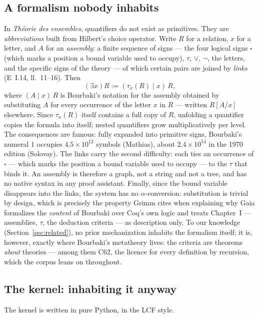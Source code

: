 \documentclass[11pt]{article}
\theoremstyle{remark}\newtheorem{example}{Example}
\begin{document}
\subsection{A formalism nobody inhabits}
\label{sec:tau}
In \emph{Th\'eorie des ensembles}, quantifiers do not exist as primitives. They are
\emph{abbreviations} built from Hilbert's choice operator. Write $R$ for a relation,
$x$ for a letter, and $A$ for an \emph{assembly}: a finite sequence of signs --- the
four logical signs $\square$ (which marks a position a bound variable used to
occupy), $\tau$, $\vee$, $\neg$, the letters, and the specific
signs of the theory --- of which certain pairs are joined by \emph{links}
(E~I.14, ll.~11--16). Then
\[ (\exists x)R := (\tau_x(R) \mid x)\,R , \]
where $(A \mid x)\,R$ is Bourbaki's notation for the assembly obtained by substituting
$A$ for every occurrence of the letter $x$ in $R$ --- written $R[A/x]$ elsewhere.
Since $\tau_x(R)$ itself contains a full copy of $R$, unfolding a quantifier copies the
formula into itself; nested quantifiers grow multiplicatively per level.
The consequences are famous: fully expanded into primitive signs, Bourbaki's numeral
$1$ occupies $4.5 \times 10^{12}$ symbols (Mathias), about $2.4 \times 10^{54}$ in the
1970 edition (Solovay). The links carry the second difficulty: each ties an occurrence
of $\square$ --- which marks the position a bound variable used to occupy --- to the
$\tau$ that binds it. An assembly is therefore a graph, not a string and not a tree,
and has no native syntax in any proof assistant. Finally, since the bound variable
disappears
into the links, the system has no $\alpha$-conversion: substitution is trivial by
design, which is precisely the property Grimm cites when explaining why Gaia
formalizes the \emph{content} of Bourbaki over Coq's own logic and treats Chapter~I
--- assemblies, $\tau$, the deduction criteria --- as description only. To our
knowledge (Section~\ref{sec:related}), no prior mechanization inhabits the formalism
itself; it is, however, exactly where Bourbaki's metatheory lives: the criteria are
theorems \emph{about} theories --- among them C62, the licence for every definition
by recursion, which the corpus leans on throughout.

\subsection{The kernel: inhabiting it anyway}
The kernel is written in pure Python, in the LCF style.
\end{document}
